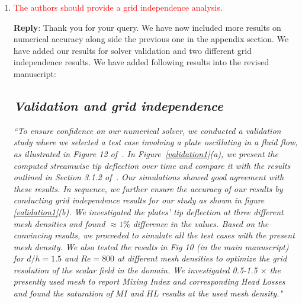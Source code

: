 \documentclass[onecolumn,a4paper,amsmath,amssym,pre]{revtex4}
\begin{document}
{\begin{enumerate}
\item \textcolor{red}{The authors should provide a grid independence analysis.}

\textbf{Reply}: Thank you for your query. We have now included more results on numerical accuracy along side the previous one in the appendix section. We have added our results for solver validation and two different grid independence results. We have added following results into the revised manuscript: 

\subsection*{\textit{Validation and grid independence}} \textit{``To ensure confidence on our numerical solver, we conducted a validation study where we selected a test case involving a plate oscillating in a fluid flow, as illustrated in Figure 12 of~\cite{Gluck2001}. In Figure~\ref{validation1}(a), we present the computed streamwise tip deflection over time and compare it with the results outlined in Section 3.1.2 of~\cite{Gluck2001}. Our simulations showed good agreement with these results. In sequence, we further ensure the accuracy of our results by conducting grid independence results for our study as shown in figure \ref{validation1}(b). We investigated the plates' tip deflection at three different mesh densities and found $\approx1\%$ difference in the values. Based on the convincing results, we proceeded to simulate all the test cases with the present mesh density. We also tested the results in Fig 10 (in the main manuscript) for $d/h=1.5$ and $Re=800$ at different mesh densities to optimize the grid resolution of the scalar field in the domain. We investigated 0.5-1.5 $\times$ the presently used mesh to report Mixing Index and corresponding Head Losses and found the saturation of $MI$ and $HL$ results at the used mesh density."}


\end{enumerate}}
\end{document}
